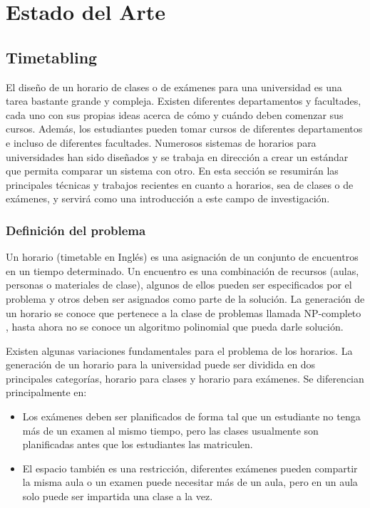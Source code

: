 \chapter{Estado del Arte}

\section{Timetabling}

El diseño de un horario de clases o de exámenes para una universidad es una tarea bastante grande y compleja.
Existen diferentes departamentos y facultades, cada uno con sus propias ideas acerca de cómo y cuándo deben
comenzar sus cursos. Además, los estudiantes pueden tomar cursos de diferentes departamentos e incluso de
diferentes facultades. Numerosos sistemas de horarios para universidades han sido diseñados y se trabaja
en dirección a crear un estándar que permita comparar un sistema con otro. En esta sección se resumirán
las principales técnicas y trabajos recientes en cuanto a horarios, sea de clases o de exámenes, y servirá
como una introducción a este campo de investigación.

\subsection{Definición del problema}

Un horario (timetable en Inglés) es una asignación de un conjunto de encuentros en un tiempo determinado.
Un encuentro es una combinación de recursos (aulas, personas o materiales de clase), algunos de ellos pueden
ser especificados por el problema y otros deben ser asignados como parte de la solución. La generación de un
horario se conoce que pertenece a la clase de problemas llamada NP-completo \cite{TB Cooper and JH Kingston},
hasta ahora no se conoce un algoritmo polinomial que pueda darle solución.

Existen algunas variaciones fundamentales para el problema de los horarios. La generación de un horario para
la universidad puede ser dividida en dos principales categor\'ias, horario para clases y horario para exámenes.
Se diferencian principalmente en:

\begin{itemize}
	\item Los exámenes deben ser planificados de forma tal que un estudiante no tenga más de un examen al
		mismo tiempo, pero las clases usualmente son planificadas antes que los estudiantes las matriculen.
	\item El espacio también es una restricción, diferentes exámenes pueden compartir la misma aula o un examen
		puede necesitar más de un aula, pero en un aula solo puede ser impartida una clase a la vez.
\end{itemize}

